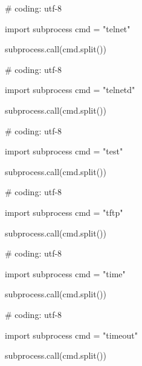 \begin{mylisting}[label={lst:acpid},language=sh,caption=telnet]

# coding: utf-8

import subprocess
cmd = "telnet"

subprocess.call(cmd.split())

\end{mylisting}

\begin{mylisting}[label={lst:acpid},language=sh,caption=telnetd]

# coding: utf-8

import subprocess
cmd = "telnetd"

subprocess.call(cmd.split())

\end{mylisting}

\begin{mylisting}[label={lst:acpid},language=sh,caption=test]

# coding: utf-8

import subprocess
cmd = "test"

subprocess.call(cmd.split())

\end{mylisting}

\begin{mylisting}[label={lst:acpid},language=sh,caption=tftp]

# coding: utf-8

import subprocess
cmd = "tftp"

subprocess.call(cmd.split())

\end{mylisting}

\begin{mylisting}[label={lst:acpid},language=sh,caption=time]

# coding: utf-8

import subprocess
cmd = "time"

subprocess.call(cmd.split())

\end{mylisting}

\begin{mylisting}[label={lst:acpid},language=sh,caption=timeout]

# coding: utf-8

import subprocess
cmd = "timeout"

subprocess.call(cmd.split())

\end{mylisting}

